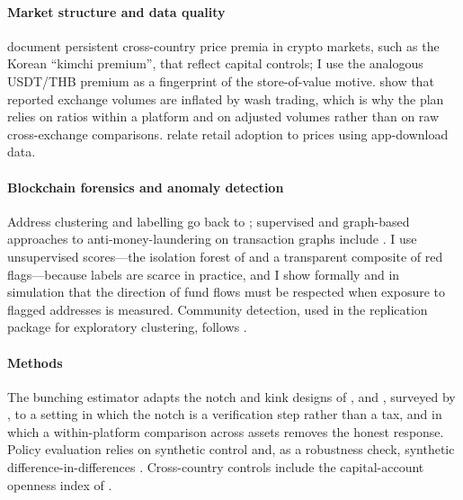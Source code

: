 \paragraph{Market structure and data quality}
\citet{makarov2020arbitrage} document persistent cross-country price premia in crypto markets, such as the Korean
``kimchi premium'', that reflect capital controls; I use the analogous USDT/THB premium as a fingerprint of the
store-of-value motive. \citet{cong2023wash} show that reported exchange volumes are inflated by wash trading, which is
why the plan relies on ratios within a platform and on adjusted volumes rather than on raw cross-exchange comparisons.
\citet{auer2022retail} relate retail adoption to prices using app-download data.

\paragraph{Blockchain forensics and anomaly detection}
Address clustering and labelling go back to \citet{meiklejohn2013fistful}; supervised and graph-based approaches to
anti-money-laundering on transaction graphs include \citet{weber2019aml}. I use unsupervised scores---the isolation forest
of \citet{liu2008iforest} and a transparent composite of red flags---because labels are scarce in practice, and I show
formally and in simulation that the direction of fund flows must be respected when exposure to flagged addresses is
measured. Community detection, used in the replication package for exploratory clustering, follows
\citet{blondel2008louvain}.

\paragraph{Methods}
The bunching estimator adapts the notch and kink designs of \citet{saez2010bunch}, \citet{chetty2011adjustment} and
\citet{kleven2013notches}, surveyed by \citet{kleven2016bunching}, to a setting in which the notch is a verification
step rather than a tax, and in which a within-platform comparison across assets removes the honest response. Policy
evaluation relies on synthetic control \citep{abadie2010synth,abadie2021using} and, as a robustness check, synthetic
difference-in-differences \citep{arkhangelsky2021sdid}. Cross-country controls include the capital-account openness
index of \citet{chinn2006capital}.
